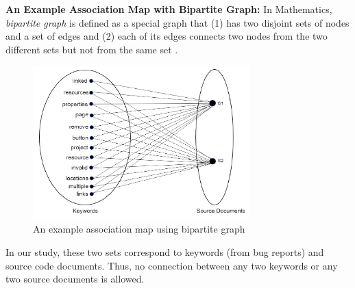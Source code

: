 \documentclass[sigconf,review,anonymous]{acmart}
\begin{document}
\textbf{An Example Association Map with Bipartite Graph:} In Mathematics, \emph{bipartite graph} is defined as a special graph that   
(1) has two disjoint sets of nodes and a set of edges and (2) each of its edges connects two nodes from the two different sets but not from the same set \cite{bipartite}.  
\begin{table}[!tb]
	\caption{Example Bug Report (\#322401, eclipse.ui.platform)}
	\label{tab:BugInfo2}
	\vspace{-.3cm}
	\vspace{-.2cm}
\end{table}
\begin{figure}
	\centering
	\includegraphics[width=3.3in]{BGraph5}
	\caption{An example association map using bipartite graph}
	\label{fig:BipartiteGraph}
	\vspace{.2cm}
\end{figure}
In our study, these two sets correspond to keywords (from bug reports) and source code documents. 
Thus, no connection between any two keywords or any two source documents is allowed.
\end{document}
